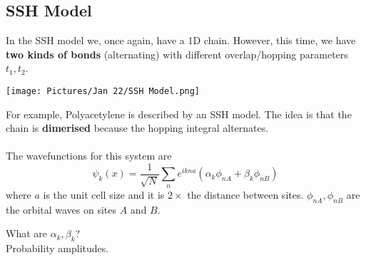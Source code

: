 \documentclass[11pt]{article}
\begin{document}
\vskip 1cm
\subsection{SSH Model}
In the SSH model we, once again, have a 1D chain. However, this time, we have \textbf{two kinds of bonds} (alternating) with different overlap/hopping parameters $t_1, t_2$.
\begin{center}
  \texttt{[image: Pictures/Jan 22/SSH Model.png]}
\end{center}
For example, Polyacetylene is described by an SSH model. The idea is that the chain is \textbf{dimerised} because the hopping integral alternates.
\\
\\
The wavefunctions for this system are $$ \psi_k(x) = \frac{1}{\sqrt{N}} \sum_{n} e^{ikna} \left( \alpha_{k} \phi_{nA} + \beta_k \phi_{nB} \right) $$ where $a$ is the unit cell size and it is $2 \times$ the distance between sites. $\phi_{nA}, \phi_{nB}$ are the orbital waves on sites $A$ and $B$. 

\begin{redbox}
What are $\alpha_k, \beta_k$? \\
Probability amplitudes.
\end{redbox}
\end{document}
